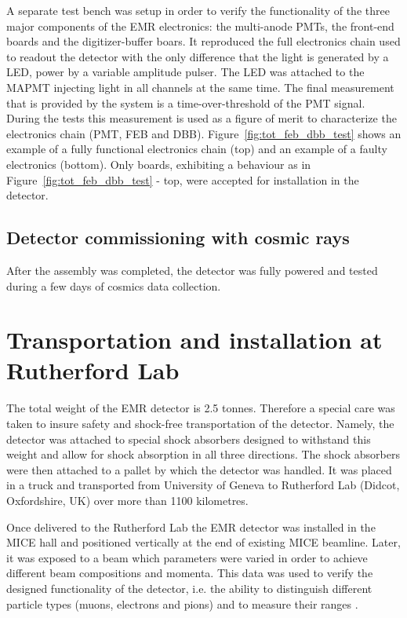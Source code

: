 \documentclass[a4paper,11pt]{article}
\begin{document}
A separate test bench was setup in order to verify the functionality of the three major components of the EMR electronics: the multi-anode PMTs, the 
front-end boards and the digitizer-buffer boars. It reproduced the full electronics chain used to readout the detector with the only difference that the
light is generated by a LED, power by a variable amplitude pulser. The LED was attached to the MAPMT injecting light in all channels at the same time. The
final measurement that is provided by the system is a time-over-threshold of the PMT signal. During the tests this measurement is used as a figure of merit
to characterize the electronics chain (PMT, FEB and DBB). Figure~\ref{fig:tot_feb_dbb_test} shows an example of a fully functional electronics chain (top)
and an example of a faulty electronics (bottom). Only boards, exhibiting a behaviour as in Figure~\ref{fig:tot_feb_dbb_test} - top, were accepted for
installation in the detector.

\subsection{Detector commissioning with cosmic rays}\label{sec:cosmics_perform}

After the assembly was completed, the detector was fully powered and tested during a few days of cosmics data collection. 

\cite{Francois}


\section{Transportation and installation at Rutherford Lab}

The total weight of the EMR detector is 2.5 tonnes. Therefore a special care was taken to insure safety and shock-free transportation of the detector.
Namely, the detector was attached to special shock absorbers designed to withstand this weight and allow for shock absorption in all three directions. The
shock absorbers were then attached to a pallet by which the detector was handled. It was placed in a truck and transported from University of Geneva to
Rutherford Lab (Didcot, Oxfordshire, UK) over more than 1100 kilometres. 

Once delivered to the Rutherford Lab the EMR detector was installed in the MICE hall and positioned vertically at the end of existing MICE beamline. Later,
it was exposed to a beam which parameters were varied in order to achieve different beam compositions and momenta. This data was used to verify the designed
functionality of the detector, i.e. the ability to distinguish different particle types (muons, electrons and pions) and to measure their ranges
\cite{performance}. 
\end{document}
